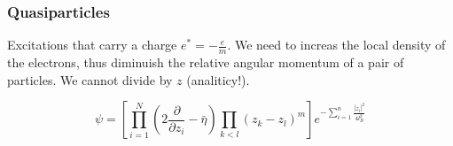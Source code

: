 \documentclass{beamer}
\begin{document}

\begin{frame}
\frametitle{Quasiparticles}
\begin{center}
Excitations that carry a charge $e^{*} = -\frac{e}{m}$. We need to increas the local density of the electrons, thus diminuish the relative angular momentum of a pair of particles. We cannot divide by $z$ (analiticy!).

\[
\psi = \left[ \prod_{i=1}^{N} \left( 2 \frac{\partial}{\partial z_i} - \bar{\eta} \right) \prod_{k < l} ( z_k - z_l ) ^m \right] e^{- \sum_{i = 1}^{n} \frac{|z_i|^2}{4 l_B^2}}
\]

\end{center}
\end{frame}
\end{document}
